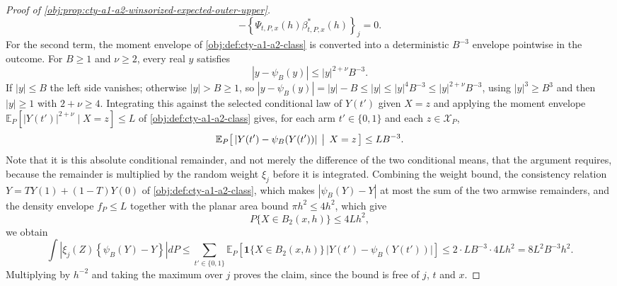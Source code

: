 \documentclass[11pt]{article}
\begin{document}
\begin{proof}[Proof of \cref{obj:prop:cty-a1-a2-winsorized-expected-outer-upper}]
\[-
\left\{\Psi_{t,P,x}(h)\beta^*_{t,P,x}(h)\right\}_j
=
0 .
\]
For the second term, the moment envelope of \cref{obj:def:cty-a1-a2-class} is converted into a deterministic \(B^{-3}\) envelope pointwise in the outcome.  For \(B\geq1\) and \(\nu\geq2\), every real \(y\) satisfies
\[
|y-\psi_B(y)|\leq|y|^{2+\nu}B^{-3} .
\]
If \(|y|\leq B\) the left side vanishes; otherwise \(|y|>B\geq1\), so \(|y-\psi_B(y)|=|y|-B\leq|y|\leq|y|^4B^{-3}\leq|y|^{2+\nu}B^{-3}\), using \(|y|^3\geq B^3\) and then \(|y|\geq1\) with \(2+\nu\geq4\).
Integrating this against the selected conditional law of \(Y(t')\) given \(X=z\) and applying the moment envelope \(\mathbb E_P[|Y(t')|^{2+\nu}\mid X=z]\leq L\) of \cref{obj:def:cty-a1-a2-class} gives, for each arm \(t'\in\{0,1\}\) and each \(z\in\mathcal X_P\),
\[
\mathbb E_P\bigl[\,|Y(t')-\psi_B(Y(t'))|\,\bigm|\,X=z\,\bigr]\leq LB^{-3} .
\]
Note that it is this absolute conditional remainder, and not merely the difference of the two conditional means, that the argument requires, because the remainder is multiplied by the random weight \(\xi_j\) before it is integrated.
Combining the weight bound, the consistency relation \(Y=TY(1)+(1-T)Y(0)\) of \cref{obj:def:cty-a1-a2-class}, which makes \(|\psi_B(Y)-Y|\) at most the sum of the two armwise remainders, and the density envelope \(f_P\leq L\) together with the planar area bound \(\pi h^2\leq4h^2\), which give
\[
P\{X\in B_2(x,h)\}\leq4Lh^2 ,
\]
we obtain
\[
\int\left|\xi_j(Z)\left\{\psi_B(Y)-Y\right\}\right|dP
\leq
\sum_{t'\in\{0,1\}}
\mathbb E_P\!\left[\mathbf 1\{X\in B_2(x,h)\}\,\bigl|Y(t')-\psi_B(Y(t'))\bigr|\right]
\leq
2\cdot LB^{-3}\cdot4Lh^2
=
8L^2B^{-3}h^2 .
\]
Multiplying by \(h^{-2}\) and taking the maximum over \(j\) proves the claim, since the bound is free of \(j\), \(t\) and \(x\).


\end{proof}
\end{document}
